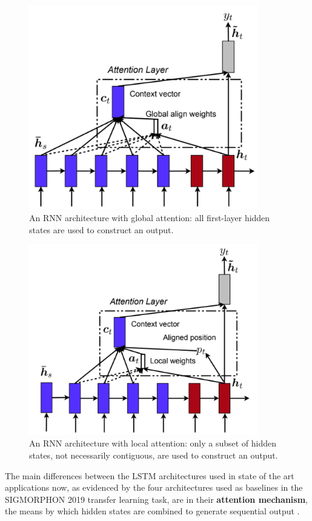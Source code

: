 \begin{figure}[t]
\includegraphics[width=10cm]{images/global.png}
\centering
\caption{An RNN architecture with global attention: all first-layer hidden states are used to construct an output. \parencite{Luong2015}}
\end{figure}

\begin{figure}[t]
\includegraphics[width=10cm]{images/local.png}
\centering
\caption{An RNN architecture with local attention: only a subset of hidden states, not necessarily contiguous, are used to construct an output. \parencite{Luong2015}}
\end{figure}

The main differences between the LSTM architectures used in state of the art applications now, as evidenced by the four architectures used as baselines in the SIGMORPHON 2019 transfer learning task, are in their \textbf{attention mechanism}, the means by which hidden states are combined to generate sequential output \parencite{Cotterell2019}. 

